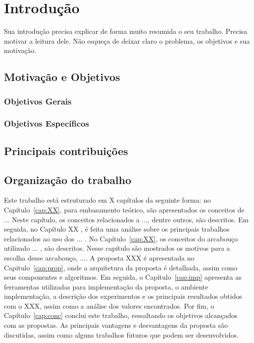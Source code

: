\chapter{Introdução} \label{cap:int}

Sua introdução precisa explicar de forma muito resumida o seu trabalho. Precisa motivar a leitura dele. Não esqueça de deixar claro o problema, os objetivos e sua motivação.


\section{Motivação e Objetivos}\label{sec:1_inicio}


\subsection{Objetivos Gerais}


\subsection{Objetivos Específicos}


\section{Principais contribuições}


\section{Organização do trabalho}\label{sec:1_org}

Este trabalho está estruturado em X capítulos da seguinte forma: no Capítulo~\ref{cap:XX}, para embasamento teórico, são apresentados os conceitos de ... Neste capítulo, os conceitos relacionados a ..., dentre outros, são descritos. Em seguida, no Capítulo XX , é feita uma análise sobre os principais trabalhos relacionados ao uso dos ... . No Capítulo~\ref{cap:XX}, os conceitos do arcabouço utilizado ... , são descritos. Nesse capítulo são mostrados os motivos para a escolha desse arcabouço, .... A proposta XXX é apresentada no Capitulo~\ref{cap:prop}, onde a arquitetura da proposta é detalhada, assim como seus componentes e algoritmos. Em seguida, o Capítulo~\ref{cap:imp} apresenta as ferramentas utilizadas para implementação da proposta, o ambiente implementação, a descrição dos experimentos e os principais resultados obtidos com o XXX, assim como a análise dos valores encontrados. Por fim, o Capítulo~\ref{cap:conc} conclui este trabalho, ressaltando os objetivos alcançados com as propostas. As principais vantagens e desvantagens da proposta são discutidas, assim como alguns trabalhos futuros que podem ser desenvolvidos. 
